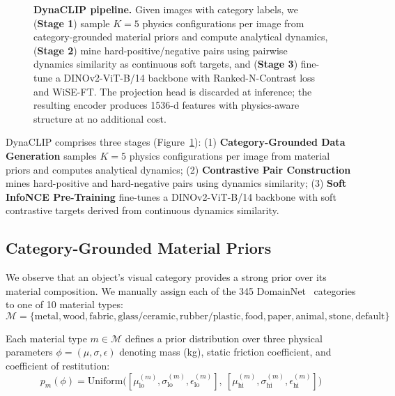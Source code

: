 \documentclass{article}
\newcommand{\methodname}{DynaCLIP}
\begin{document}
\begin{figure}[t]
{%
}
\caption{\textbf{\methodname{} pipeline.} Given images with category labels, we (\textbf{Stage 1}) sample $K{=}5$ physics configurations per image from category-grounded material priors and compute analytical dynamics, (\textbf{Stage 2}) mine hard-positive/negative pairs using pairwise dynamics similarity as continuous soft targets, and (\textbf{Stage 3}) fine-tune a DINOv2-ViT-B/14 backbone with Ranked-N-Contrast loss and WiSE-FT. The projection head is discarded at inference; the resulting encoder produces 1536-d features with physics-aware structure at no additional cost.}
\label{fig:method}
\end{figure}

\methodname{} comprises three stages (Figure~\ref{fig:method}): (1) \textbf{Category-Grounded Data Generation} samples $K{=}5$ physics configurations per image from material priors and computes analytical dynamics; (2) \textbf{Contrastive Pair Construction} mines hard-positive and hard-negative pairs using dynamics similarity; (3) \textbf{Soft InfoNCE Pre-Training} fine-tunes a DINOv2-ViT-B/14 backbone with soft contrastive targets derived from continuous dynamics similarity.


\subsection{Category-Grounded Material Priors}
\label{sec:priors}

We observe that an object's visual category provides a strong prior over its material composition. We manually assign each of the 345 DomainNet~\cite{peng2019domainnet} categories to one of 10 material types:
\begin{equation}
    \mathcal{M} = \{\text{metal}, \text{wood}, \text{fabric}, \text{glass/ceramic}, \text{rubber/plastic}, \text{food}, \text{paper}, \text{animal}, \text{stone}, \text{default}\}
\end{equation}

Each material type $m \in \mathcal{M}$ defines a prior distribution over three physical parameters $\phi = (\mu, \sigma, \epsilon)$ denoting mass (kg), static friction coefficient, and coefficient of restitution:
\begin{equation}
    p_m(\phi) = \text{Uniform}\big([\mu_\text{lo}^{(m)}, \sigma_\text{lo}^{(m)}, \epsilon_\text{lo}^{(m)}],\ [\mu_\text{hi}^{(m)}, \sigma_\text{hi}^{(m)}, \epsilon_\text{hi}^{(m)}]\big)
\end{equation}
\end{document}
